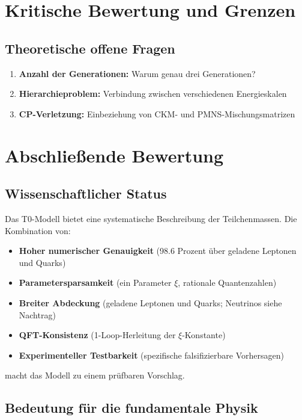 \section{Kritische Bewertung und Grenzen}
\label{sec:critical_evaluation}

\subsection{Theoretische offene Fragen}
\label{subsec:open_questions}

\begin{enumerate}
	\item \textbf{Anzahl der Generationen:} Warum genau drei Generationen?
	\item \textbf{Hierarchieproblem:} Verbindung zwischen verschiedenen Energieskalen
	\item \textbf{CP-Verletzung:} Einbeziehung von CKM- und PMNS-Mischungsmatrizen
\end{enumerate}

\section{Abschließende Bewertung}
\label{sec:concluding_assessment}

\subsection{Wissenschaftlicher Status}
\label{subsec:scientific_status}

Das T0-Modell bietet eine systematische Beschreibung der Teilchenmassen. Die Kombination von:

\begin{itemize}
	\item \textbf{Hoher numerischer Genauigkeit} (98.6 Prozent über geladene Leptonen und Quarks)
	\item \textbf{Parametersparsamkeit} (ein Parameter $\xi$, rationale Quantenzahlen)
	\item \textbf{Breiter Abdeckung} (geladene Leptonen und Quarks; Neutrinos siehe Nachtrag)
	\item \textbf{QFT-Konsistenz} (1-Loop-Herleitung der $\xi$-Konstante)
	\item \textbf{Experimenteller Testbarkeit} (spezifische falsifizierbare Vorhersagen)
\end{itemize}

macht das Modell zu einem prüfbaren Vorschlag.

\subsection{Bedeutung für die fundamentale Physik}
\label{subsec:significance_physics}

